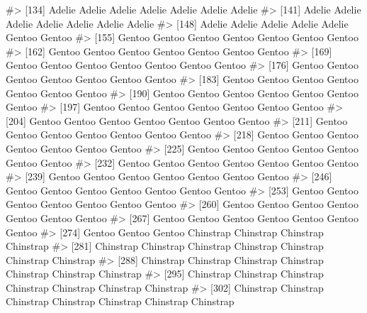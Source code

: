 \documentclass[
  letterpaper,
  DIV=11,
  numbers=noendperiod]{scrreprt}
\newenvironment{Shaded}{\begin{snugshade}}{\end{snugshade}}
\newcommand{\CommentTok}[1]{\textcolor[rgb]{0.37,0.37,0.37}{#1}}
\begin{document}
\begin{Shaded}
\begin{Highlighting}[]
\CommentTok{\#\textgreater{} [134] Adelie    Adelie    Adelie    Adelie    Adelie    Adelie    Adelie   }
\CommentTok{\#\textgreater{} [141] Adelie    Adelie    Adelie    Adelie    Adelie    Adelie    Adelie   }
\CommentTok{\#\textgreater{} [148] Adelie    Adelie    Adelie    Adelie    Adelie    Gentoo    Gentoo   }
\CommentTok{\#\textgreater{} [155] Gentoo    Gentoo    Gentoo    Gentoo    Gentoo    Gentoo    Gentoo   }
\CommentTok{\#\textgreater{} [162] Gentoo    Gentoo    Gentoo    Gentoo    Gentoo    Gentoo    Gentoo   }
\CommentTok{\#\textgreater{} [169] Gentoo    Gentoo    Gentoo    Gentoo    Gentoo    Gentoo    Gentoo   }
\CommentTok{\#\textgreater{} [176] Gentoo    Gentoo    Gentoo    Gentoo    Gentoo    Gentoo    Gentoo   }
\CommentTok{\#\textgreater{} [183] Gentoo    Gentoo    Gentoo    Gentoo    Gentoo    Gentoo    Gentoo   }
\CommentTok{\#\textgreater{} [190] Gentoo    Gentoo    Gentoo    Gentoo    Gentoo    Gentoo    Gentoo   }
\CommentTok{\#\textgreater{} [197] Gentoo    Gentoo    Gentoo    Gentoo    Gentoo    Gentoo    Gentoo   }
\CommentTok{\#\textgreater{} [204] Gentoo    Gentoo    Gentoo    Gentoo    Gentoo    Gentoo    Gentoo   }
\CommentTok{\#\textgreater{} [211] Gentoo    Gentoo    Gentoo    Gentoo    Gentoo    Gentoo    Gentoo   }
\CommentTok{\#\textgreater{} [218] Gentoo    Gentoo    Gentoo    Gentoo    Gentoo    Gentoo    Gentoo   }
\CommentTok{\#\textgreater{} [225] Gentoo    Gentoo    Gentoo    Gentoo    Gentoo    Gentoo    Gentoo   }
\CommentTok{\#\textgreater{} [232] Gentoo    Gentoo    Gentoo    Gentoo    Gentoo    Gentoo    Gentoo   }
\CommentTok{\#\textgreater{} [239] Gentoo    Gentoo    Gentoo    Gentoo    Gentoo    Gentoo    Gentoo   }
\CommentTok{\#\textgreater{} [246] Gentoo    Gentoo    Gentoo    Gentoo    Gentoo    Gentoo    Gentoo   }
\CommentTok{\#\textgreater{} [253] Gentoo    Gentoo    Gentoo    Gentoo    Gentoo    Gentoo    Gentoo   }
\CommentTok{\#\textgreater{} [260] Gentoo    Gentoo    Gentoo    Gentoo    Gentoo    Gentoo    Gentoo   }
\CommentTok{\#\textgreater{} [267] Gentoo    Gentoo    Gentoo    Gentoo    Gentoo    Gentoo    Gentoo   }
\CommentTok{\#\textgreater{} [274] Gentoo    Gentoo    Gentoo    Chinstrap Chinstrap Chinstrap Chinstrap}
\CommentTok{\#\textgreater{} [281] Chinstrap Chinstrap Chinstrap Chinstrap Chinstrap Chinstrap Chinstrap}
\CommentTok{\#\textgreater{} [288] Chinstrap Chinstrap Chinstrap Chinstrap Chinstrap Chinstrap Chinstrap}
\CommentTok{\#\textgreater{} [295] Chinstrap Chinstrap Chinstrap Chinstrap Chinstrap Chinstrap Chinstrap}
\CommentTok{\#\textgreater{} [302] Chinstrap Chinstrap Chinstrap Chinstrap Chinstrap Chinstrap Chinstrap}

\end{Highlighting}
\end{Shaded}
\end{document}
